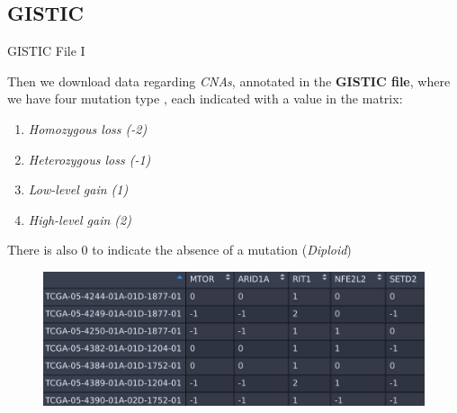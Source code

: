 \documentclass{beamer}
\begin{document}
\subsection{GISTIC}
\begin{frame}{GISTIC File I}
  \begin{block}{}
    Then we download data regarding \textit{CNAs}, annotated in the
    \textbf{GISTIC file}, where we have four mutation type \cite{cbioportal},
    each indicated with a value in the matrix: 
    \begin{enumerate}
      \item \textit{Homozygous loss (-2)}
      \item \textit{Heterozygous loss (-1)}
      \item \textit{Low-level gain (1)}
      \item \textit{High-level gain (2)}
    \end{enumerate}
    There is also 0 to indicate the absence of a mutation (\textit{Diploid})
  \end{block}
  \begin{figure}
    \centering
    \includegraphics[scale = 0.22]{img/gistic_r.jpg}
  \end{figure}
\end{frame}
\end{document}

